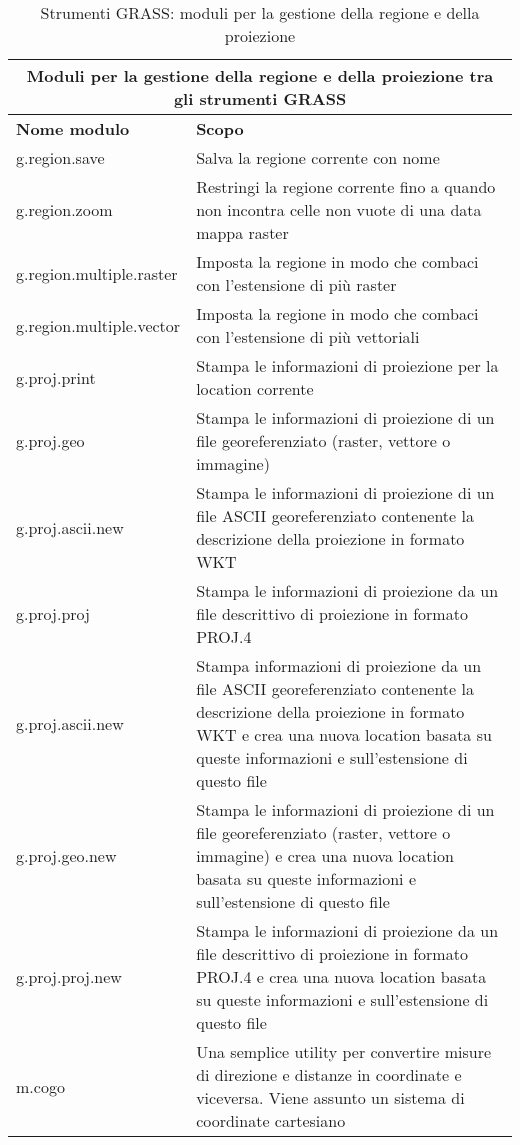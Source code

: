 \begin{table}[ht]
\centering
\caption{Strumenti GRASS: moduli per la gestione della regione e della proiezione}\medskip
 \begin{tabular}{|p{4cm}|p{12cm}|}
  \hline \multicolumn{2}{|c|}{\textbf{Moduli per la gestione della regione e della proiezione tra gli strumenti GRASS}} \\
  \hline \textbf{Nome modulo} & \textbf{Scopo} \\
  \hline g.region.save & Salva la regione corrente con nome \\
  \hline g.region.zoom & Restringi la regione corrente fino a quando non incontra celle non vuote di una data mappa raster \\
  \hline g.region.multiple.raster & Imposta la regione in modo che combaci con l'estensione di più raster \\
  \hline g.region.multiple.vector & Imposta la regione in modo che combaci con l'estensione di più vettoriali \\
  \hline g.proj.print & Stampa le informazioni di proiezione per la location corrente \\
  \hline g.proj.geo & Stampa le informazioni di proiezione di un file georeferenziato (raster, vettore o immagine)\\
  \hline g.proj.ascii.new & Stampa le informazioni di proiezione di un file ASCII georeferenziato contenente la descrizione della proiezione in formato WKT \\
  \hline g.proj.proj & Stampa le informazioni di proiezione da un file descrittivo di proiezione in formato PROJ.4 \\
  \hline g.proj.ascii.new & Stampa informazioni di proiezione da un file ASCII georeferenziato contenente la descrizione della proiezione in formato WKT e crea una nuova location basata su queste informazioni e sull'estensione di questo file \\
  \hline g.proj.geo.new & Stampa le informazioni di proiezione di un file georeferenziato (raster, vettore o immagine) e crea una nuova location basata su queste informazioni e sull'estensione di questo file \\
  \hline g.proj.proj.new & Stampa le informazioni di proiezione da un file descrittivo di proiezione in formato PROJ.4 e crea una nuova location basata su queste informazioni e sull'estensione di questo file \\
  \hline m.cogo & Una semplice utility per convertire misure di direzione e distanze in coordinate e viceversa. Viene assunto un sistema di coordinate cartesiano \\
\hline
\end{tabular}
\end{table}

